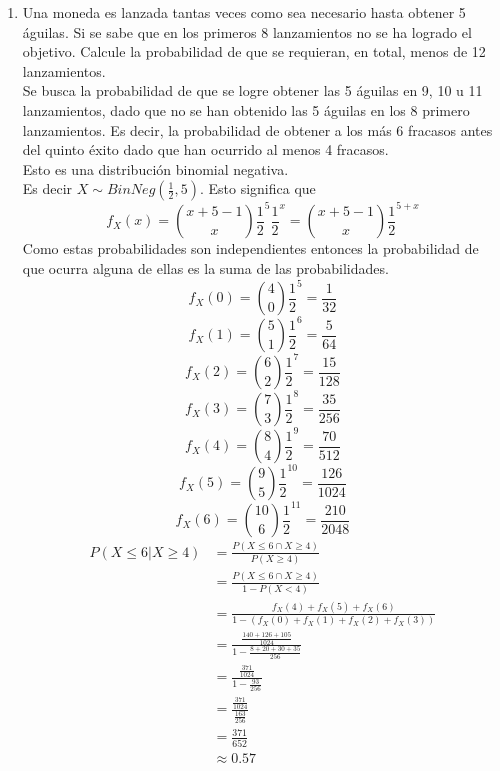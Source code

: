 \documentclass[11pt,a4paper]{report}
\begin{document}
\begin{enumerate}
		\item{
			Una moneda es lanzada tantas veces como sea necesario hasta obtener
            5 águilas. Si se sabe que en los primeros 8 lanzamientos no se ha
            logrado el objetivo. Calcule la probabilidad de que se requieran, en
            total, menos de 12 lanzamientos.\\
			Se busca la probabilidad de que se logre obtener las 5 águilas en 9,
			10 u 11 lanzamientos, dado que no se han obtenido las 5 águilas en
			los 8 primero lanzamientos. Es decir, la probabilidad de obtener a
			los más 6 fracasos antes del quinto éxito dado que han ocurrido
			al menos 4 fracasos. \\
			Esto es una distribución binomial negativa.\\
			Es decir $X \sim BinNeg(\frac{1}{2}, 5)$. Esto significa que
			\[f_X(x) = {x+5-1 \choose x} \frac{1}{2}^5 \frac{1}{2}^x =
			{x+5-1 \choose x} \frac{1}{2}^{5+x}\]
			Como estas probabilidades son independientes entonces la probabilidad
			de que ocurra alguna de ellas es la suma de las probabilidades.
			\[f_X(0) = {4 \choose 0} \frac{1}{2}^{5} = \frac{1}{32}\]
			\[f_X(1) = {5 \choose 1} \frac{1}{2}^{6} = \frac{5}{64}\]
			\[f_X(2) = {6 \choose 2} \frac{1}{2}^{7} = \frac{15}{128}\]
			\[f_X(3) = {7 \choose 3} \frac{1}{2}^{8} = \frac{35}{256}\]
			\[f_X(4) = {8 \choose 4} \frac{1}{2}^{9} = \frac{70}{512}\]
			\[f_X(5) = {9 \choose 5} \frac{1}{2}^{10} = \frac{126}{1024}\]
			\[f_X(6) = {10 \choose 6} \frac{1}{2}^{11} = \frac{210}{2048}\]
			\begin{align*}
				P(X \leq 6 | X \geq 4) &= \frac{P(X \leq 6 \cap X \geq 4)}{P(X \geq 4)}\\
							  &=\frac{P(X \leq 6 \cap X \geq 4)}{1-P(X < 4)}  \\
							  &=\frac{f_X(4) + f_X(5) + f_X(6)}
							  {1-(f_X(0) + f_X(1) + f_X(2)+ f_X(3))}  \\
							  &= \frac{\frac{140+126+105}{1024}}
							  {1-\frac{8+20+30+35}{256}} \\
							  &= \frac{\frac{371}{1024}}{1-\frac{93}{256}} \\
							  &= \frac{\frac{371}{1024}}{\frac{163}{256}} \\
							  &= \frac{371}{652} \\
							  &\approx 0.57
			\end{align*}
		}


\end{enumerate}
\end{document}
